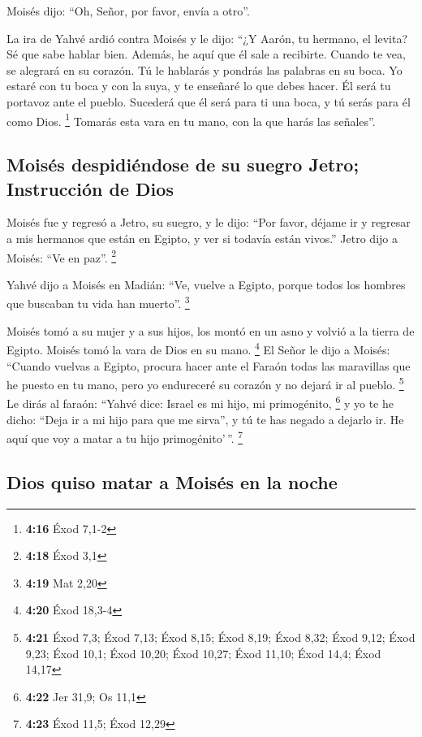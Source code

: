  Moisés dijo: ``Oh, Señor, por favor, envía a otro''.

 La ira de Yahvé ardió contra Moisés y le dijo: ``¿Y
Aarón, tu hermano, el levita? Sé que sabe hablar bien. Además, he aquí
que él sale a recibirte. Cuando te vea, se alegrará en su corazón.
 Tú le hablarás y pondrás las palabras en su boca. Yo
estaré con tu boca y con la suya, y te enseñaré lo que debes hacer.
 Él será tu portavoz ante el pueblo. Sucederá que él será
para ti una boca, y tú serás para él como Dios. \footnote{\textbf{4:16}
  Éxod 7,1-2}  Tomarás esta vara en tu mano, con la que
harás las señales''.

\hypertarget{moisuxe9s-despidiuxe9ndose-de-su-suegro-jetro-instrucciuxf3n-de-dios}{%
\subsection{Moisés despidiéndose de su suegro Jetro; Instrucción de
Dios}\label{moisuxe9s-despidiuxe9ndose-de-su-suegro-jetro-instrucciuxf3n-de-dios}}

 Moisés fue y regresó a Jetro, su suegro, y le dijo:
``Por favor, déjame ir y regresar a mis hermanos que están en Egipto, y
ver si todavía están vivos.'' Jetro dijo a Moisés: ``Ve en paz''.
\footnote{\textbf{4:18} Éxod 3,1}

 Yahvé dijo a Moisés en Madián: ``Ve, vuelve a Egipto,
porque todos los hombres que buscaban tu vida han muerto''. \footnote{\textbf{4:19}
  Mat 2,20}

 Moisés tomó a su mujer y a sus hijos, los montó en un
asno y volvió a la tierra de Egipto. Moisés tomó la vara de Dios en su
mano. \footnote{\textbf{4:20} Éxod 18,3-4}  El Señor le
dijo a Moisés: ``Cuando vuelvas a Egipto, procura hacer ante el Faraón
todas las maravillas que he puesto en tu mano, pero yo endureceré su
corazón y no dejará ir al pueblo. \footnote{\textbf{4:21} Éxod 7,3; Éxod
  7,13; Éxod 8,15; Éxod 8,19; Éxod 8,32; Éxod 9,12; Éxod 9,23; Éxod
  10,1; Éxod 10,20; Éxod 10,27; Éxod 11,10; Éxod 14,4; Éxod 14,17}
 Le dirás al faraón: ``Yahvé dice: Israel es mi hijo, mi
primogénito, \footnote{\textbf{4:22} Jer 31,9; Os 11,1} 
y yo te he dicho: ``Deja ir a mi hijo para que me sirva'', y tú te has
negado a dejarlo ir. He aquí que voy a matar a tu hijo primogénito'\,''.
\footnote{\textbf{4:23} Éxod 11,5; Éxod 12,29}

\hypertarget{dios-quiso-matar-a-moisuxe9s-en-la-noche}{%
\subsection{Dios quiso matar a Moisés en la
noche}\label{dios-quiso-matar-a-moisuxe9s-en-la-noche}}

